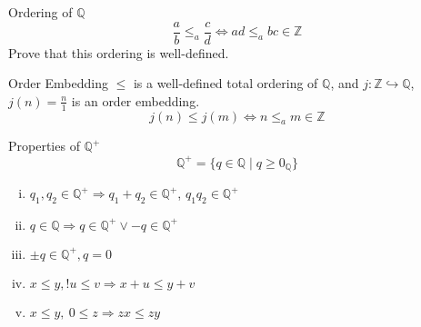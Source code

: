 \documentclass[10pt]{extarticle}
\newcommand{\Q}{\mathbb{Q}}
\newcommand{\Z}{\mathbb{Z}}
\begin{document}
  \begin{problem}{Ordering of $\Q$}
    \[
      \frac{a}{b} \leq_a \frac{c}{d} \Leftrightarrow ad\leq_{a} bc \in \Z
    \] 
    Prove that this ordering is well-defined.

    \begin{problem}{Order Embedding}
      $\leq$ is a well-defined total ordering of $\Q$, and $j: \Z\hookrightarrow \Q$, $j(n) = \frac{n}{1}$ is an order embedding.
      \[
        j(n) \leq j(m) \Leftrightarrow n\leq_a m\in \Z
      \] 
    \end{problem}
    \begin{problem}{Properties of $\Q^+$}
      \[
        \Q^+ = \{q \in \Q \mid q \geq 0_{\Q}\}
      \] 
      \begin{enumerate}[(i)]
        \item $q_1,q_2\in \Q^+ \Rightarrow q_1 + q_2 \in \Q^+$, $q_1q_2 \in \Q^+$
        \item $q\in \Q \Rightarrow q\in \Q^+ \vee -q\in \Q^+$
        \item $\pm q\in \Q^+,q = 0$
        \item $x\leq y,!u\leq v \Rightarrow x+u \leq y+v$
        \item $x\leq y,~0\leq z \Rightarrow zx \leq zy$
      \end{enumerate}
    \end{problem}
  \end{problem}
\end{document}
